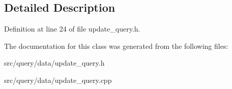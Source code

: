 \subsection{Detailed Description}


Definition at line 24 of file update\+\_\+query.\+h.



The documentation for this class was generated from the following files\+:\begin{DoxyCompactItemize}
\item 
src/query/data/update\+\_\+query.\+h\item 
src/query/data/update\+\_\+query.\+cpp\end{DoxyCompactItemize}
